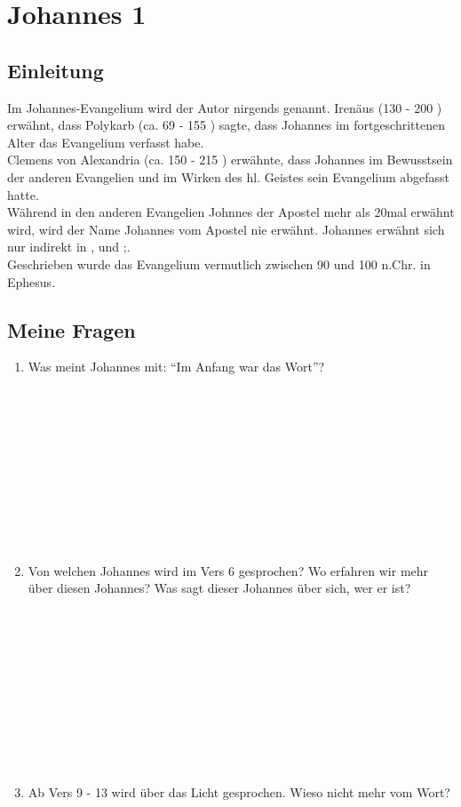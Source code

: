 \documentclass[fontsize=12pt]{mybib}
\author{OTS}
\newcommand{\place}{ \\\\\\\\\\\\\\\\\\\\\\ }
\begin{document}
\section{Johannes 1}

\subsection{Einleitung}
Im Johannes-Evangelium wird der Autor nirgends genannt. Irenäus (130 - 200 \nChr) erwähnt, dass Polykarb (ca. 69 - 155 \nChr) sagte, dass Johannes im fortgeschrittenen Alter das Evangelium verfasst habe.\\
Clemens von Alexandria (ca. 150 - 215 \nChr) erwähnte, dass Johannes im Bewusstsein der anderen Evangelien und im Wirken des hl. Geistes sein Evangelium abgefasst hatte.\\
Während in den anderen Evangelien Johnnes der Apostel mehr als 20mal erwähnt wird, wird der Name Johannes vom Apostel nie erwähnt. Johannes erwähnt sich nur indirekt in ,  und ;. \\
Geschrieben wurde das Evangelium vermutlich zwischen 90 und 100 n.Chr. in Ephesus.

\subsection{ Meine Fragen }
\begin{enumerate}
    \item Was meint Johannes mit: \enquote{Im Anfang war das Wort}?\place
    \item Von welchen Johannes wird im Vers 6 gesprochen? Wo erfahren wir mehr über diesen Johannes? Was sagt dieser Johannes über sich, wer er ist?\place
    \item Ab Vers 9 - 13 wird über das Licht gesprochen. Wieso nicht mehr vom Wort?\place
\end{enumerate}
\end{document}
